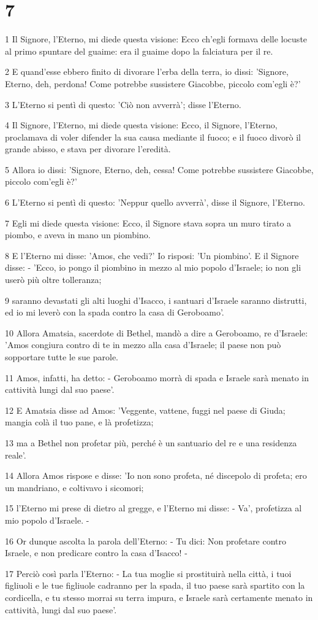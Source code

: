 \chapter{7}

\par 1 Il Signore, l'Eterno, mi diede questa visione: Ecco ch'egli formava delle locuste al primo spuntare del guaime: era il guaime dopo la falciatura per il re.
\par 2 E quand'esse ebbero finito di divorare l'erba della terra, io dissi: 'Signore, Eterno, deh, perdona! Come potrebbe sussistere Giacobbe, piccolo com'egli è?'
\par 3 L'Eterno si pentì di questo: 'Ciò non avverrà'; disse l'Eterno.
\par 4 Il Signore, l'Eterno, mi diede questa visione: Ecco, il Signore, l'Eterno, proclamava di voler difender la sua causa mediante il fuoco; e il fuoco divorò il grande abisso, e stava per divorare l'eredità.
\par 5 Allora io dissi: 'Signore, Eterno, deh, cessa! Come potrebbe sussistere Giacobbe, piccolo com'egli è?'
\par 6 L'Eterno si pentì di questo: 'Neppur quello avverrà', disse il Signore, l'Eterno.
\par 7 Egli mi diede questa visione: Ecco, il Signore stava sopra un muro tirato a piombo, e aveva in mano un piombino.
\par 8 E l'Eterno mi disse: 'Amos, che vedi?' Io risposi: 'Un piombino'. E il Signore disse: - 'Ecco, io pongo il piombino in mezzo al mio popolo d'Israele; io non gli userò più oltre tolleranza;
\par 9 saranno devastati gli alti luoghi d'Isacco, i santuari d'Israele saranno distrutti, ed io mi leverò con la spada contro la casa di Geroboamo'.
\par 10 Allora Amatsia, sacerdote di Bethel, mandò a dire a Geroboamo, re d'Israele: 'Amos congiura contro di te in mezzo alla casa d'Israele; il paese non può sopportare tutte le sue parole.
\par 11 Amos, infatti, ha detto: - Geroboamo morrà di spada e Israele sarà menato in cattività lungi dal suo paese'.
\par 12 E Amatsia disse ad Amos: 'Veggente, vattene, fuggi nel paese di Giuda; mangia colà il tuo pane, e là profetizza;
\par 13 ma a Bethel non profetar più, perché è un santuario del re e una residenza reale'.
\par 14 Allora Amos rispose e disse: 'Io non sono profeta, né discepolo di profeta; ero un mandriano, e coltivavo i sicomori;
\par 15 l'Eterno mi prese di dietro al gregge, e l'Eterno mi disse: - Va', profetizza al mio popolo d'Israele. -
\par 16 Or dunque ascolta la parola dell'Eterno: - Tu dici: Non profetare contro Israele, e non predicare contro la casa d'Isacco! -
\par 17 Perciò così parla l'Eterno: - La tua moglie si prostituirà nella città, i tuoi figliuoli e le tue figliuole cadranno per la spada, il tuo paese sarà spartito con la cordicella, e tu stesso morrai su terra impura, e Israele sarà certamente menato in cattività, lungi dal suo paese'.

